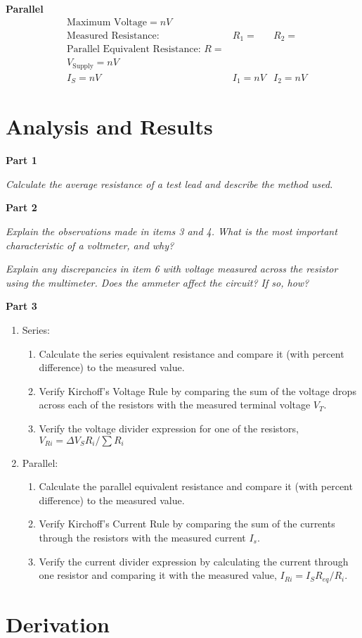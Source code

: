 \documentclass[twocolumn,english]{IEEEtran}
\theoremstyle{plain}
\theoremstyle{plain}
\begin{document}
  \textbf{Parallel}
  \begin{align*}
   &\text{Maximum Voltage} = n V			\\
   &\text{Measured Resistance: }	&R_1 = 	&R_2 =	\\
   &\text{Parallel Equivalent Resistance: } R =		\\
   &V_{\text{Supply}} = nV				\\
   &I_S = n V	&I_1 = n V	&I_2 = n V
  \end{align*}

\section{Analysis and Results}
\textbf{Part 1}

\textit{Calculate the average resistance of a test lead and describe the method used.}


\textbf{Part 2}

\textit{Explain the observations made in items 3 and 4. What is the most important characteristic of a voltmeter, and why?}

\textit{Explain any discrepancies in item 6 with voltage measured across the resistor using the multimeter. Does the ammeter affect the circuit? If so, how?}

\textbf{Part 3}
\begin{enumerate}
 \item Series: \begin{enumerate}
               \item Calculate the series equivalent resistance and compare it (with percent difference) to the measured value.
               \item Verify Kirchoff's Voltage Rule by comparing the sum of the voltage drops across each of the resistors with the measured terminal voltage $V_T$.
               \item Verify the voltage divider expression for one of the resistors, $V_{Ri} = \Delta V_S R_i / \sum R_i$
              \end{enumerate}
  \item Parallel: \begin{enumerate}
                   \item Calculate the parallel equivalent resistance and compare it (with percent difference) to the measured value.
                   \item Verify Kirchoff's Current Rule by comparing the sum of the currents through the resistors with the measured current $I_s$.
                   \item Verify the current divider expression by calculating the current through one resistor and comparing it with the measured value, $I_{Ri} = I_S R_{eq} / R_i$.
                  \end{enumerate}


\end{enumerate}

\appendices{}

\section{Derivation}\label{append:deriv}


%
%
\end{document}
